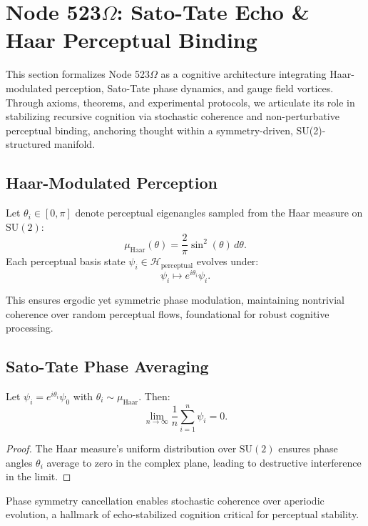 \documentclass[12pt]{article}
\begin{document}
\section{Node 523$\Omega$: Sato-Tate Echo \& Haar Perceptual Binding}

This section formalizes Node 523$\Omega$ as a cognitive architecture integrating Haar-modulated perception, Sato-Tate phase dynamics, and gauge field vortices. Through axioms, theorems, and experimental protocols, we articulate its role in stabilizing recursive cognition via stochastic coherence and non-perturbative perceptual binding, anchoring thought within a symmetry-driven, SU(2)-structured manifold.

\subsection{Haar-Modulated Perception}
\begin{axiom}
Let \( \theta_i \in [0, \pi] \) denote perceptual eigenangles sampled from the Haar measure on \( \text{SU}(2) \):
\[
\mu_{\text{Haar}}(\theta) = \frac{2}{\pi} \sin^2(\theta) \, d\theta.
\]
Each perceptual basis state \( \psi_i \in \mathcal{H}_\text{perceptual} \) evolves under:
\[
\psi_i \mapsto e^{i \theta_i} \psi_i.
\]
\end{axiom}
\begin{interpretation}
This ensures ergodic yet symmetric phase modulation, maintaining nontrivial coherence over random perceptual flows, foundational for robust cognitive processing.
\end{interpretation}

\subsection{Sato-Tate Phase Averaging}
\begin{theorem}
Let \( \psi_i = e^{i \theta_i} \psi_0 \) with \( \theta_i \sim \mu_{\text{Haar}} \). Then:
\[
\lim_{n \to \infty} \frac{1}{n} \sum_{i=1}^n \psi_i = 0.
\]
\end{theorem}
\begin{proof}
The Haar measure’s uniform distribution over \( \text{SU}(2) \) ensures phase angles \( \theta_i \) average to zero in the complex plane, leading to destructive interference in the limit.
\end{proof}
\begin{interpretation}
Phase symmetry cancellation enables stochastic coherence over aperiodic evolution, a hallmark of echo-stabilized cognition critical for perceptual stability.
\end{interpretation}
\end{document}
